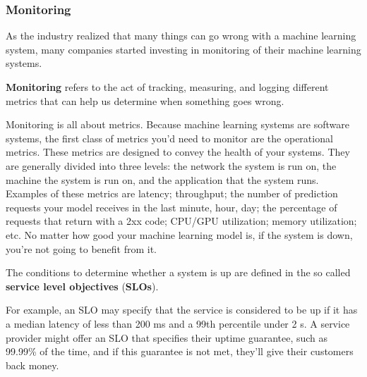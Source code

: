 \subsubsection{Monitoring}

As the industry realized that many things can go wrong with a machine learning system, many companies started
investing in monitoring of their machine learning systems.

\bd[Monitoring]
\textbf{Monitoring} refers to the act of tracking, measuring, and logging different metrics that can help us determine
when something goes wrong.
\ed

Monitoring is all about metrics. Because machine learning systems are software systems, the first class of metrics
you'd need to monitor are the operational metrics. These metrics are designed to convey the health of your systems.
They are generally divided into three levels: the network the system is run on, the machine the system is run on, and
the application that the system runs. Examples of these metrics are latency; throughput; the number of prediction
requests your model receives in the last minute, hour, day; the percentage of requests that return with a 2xx code;
CPU/GPU utilization; memory utilization; etc. No matter how good your machine learning model is, if the system is
down, you're not going to benefit from it.

The conditions to determine whether a system is up are defined in the so called \textbf{service level objectives}
(\textbf{SLOs}).
\ed

\be
For example, an SLO may specify that the service is considered to be up if it has a median latency of less than 200
ms and a 99th percentile under 2 s. A service provider might offer an SLO that specifies their uptime guarantee, such
as 99.99\% of the time, and if this guarantee is not met, they'll give their customers back money.
\ee

